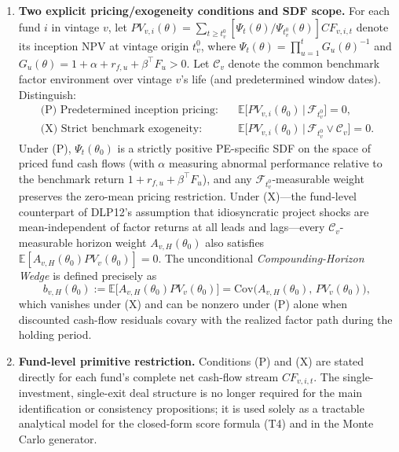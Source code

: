 \documentclass[11pt]{article}
\newcommand{\E}{\mathbb{E}}
\newcommand{\Cov}{\mathrm{Cov}}
\newcommand{\C}{\mathcal{C}}
\newcommand{\F}{\mathcal{F}}
\begin{document}
\begin{enumerate}[label=\textbf{A\arabic*.}]
\item \textbf{Two explicit pricing/exogeneity conditions and SDF scope.} For each fund $i$ in vintage $v$, let $PV_{v,i}(\theta)=\sum_{t\ge t_v^0}[\Psi_t(\theta)/\Psi_{t_v^0}(\theta)]CF_{v,i,t}$ denote its inception NPV at vintage origin $t_v^0$, where $\Psi_t(\theta)=\prod_{u=1}^t G_u(\theta)^{-1}$ and $G_u(\theta)=1+\alpha+r_{f,u}+\beta^\top F_u>0$. Let $\C_v$ denote the common benchmark factor environment over vintage $v$'s life (and predetermined window dates). Distinguish:
\begin{align*}
\text{(P) Predetermined inception pricing:}\quad & \E\bigl[PV_{v,i}(\theta_0)\,\big|\,\F_{t_v^0}\bigr]=0,\\
\text{(X) Strict benchmark exogeneity:}\quad & \E\bigl[PV_{v,i}(\theta_0)\,\big|\,\F_{t_v^0}\vee\C_v\bigr]=0.
\end{align*}
Under (P), $\Psi_t(\theta_0)$ is a strictly positive PE-specific SDF on the space of priced fund cash flows (with $\alpha$ measuring abnormal performance relative to the benchmark return $1+r_{f,u}+\beta^\top F_u$), and any $\F_{t_v^0}$-measurable weight preserves the zero-mean pricing restriction. Under (X)—the fund-level counterpart of DLP12's assumption that idiosyncratic project shocks are mean-independent of factor returns at all leads and lags—every $\C_v$-measurable horizon weight $A_{v,H}(\theta_0)$ also satisfies $\E[A_{v,H}(\theta_0)PV_v(\theta_0)]=0$. The unconditional \emph{Compounding-Horizon Wedge} is defined precisely as
\[
b_{v,H}(\theta_0):=\E\bigl[A_{v,H}(\theta_0)PV_v(\theta_0)\bigr]=\Cov\bigl(A_{v,H}(\theta_0),\,PV_v(\theta_0)\bigr),
\]
which vanishes under (X) and can be nonzero under (P) alone when discounted cash-flow residuals covary with the realized factor path during the holding period.

\item \textbf{Fund-level primitive restriction.} Conditions (P) and (X) are stated directly for each fund's complete net cash-flow stream $CF_{v,i,t}$. The single-investment, single-exit deal structure is no longer required for the main identification or consistency propositions; it is used solely as a tractable analytical model for the closed-form score formula (T4) and in the Monte Carlo generator.


\end{enumerate}
\end{document}
